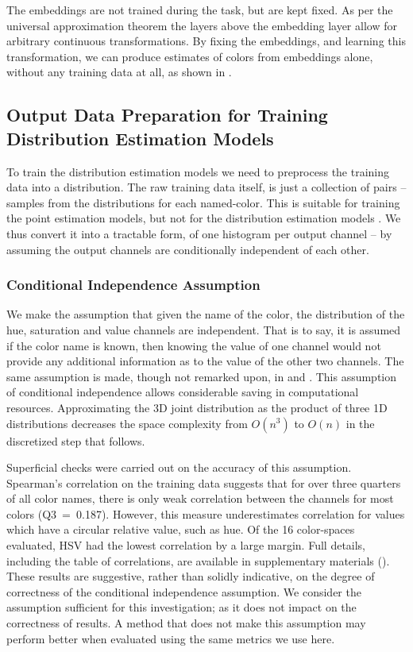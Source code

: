 The embeddings are not trained during the task, but are kept fixed.
As per the universal approximation theorem \parencite{leshno1993uat, SONODA2017uat} the layers above the embedding layer allow for arbitrary continuous transformations.
By fixing the embeddings, and learning this transformation,
we can produce estimates of colors from embeddings alone, without any training data at all, as shown in .

\subsection{Output Data Preparation for Training Distribution Estimation Models}\label{sec:output-data-preparation}
To train the distribution estimation models we need to preprocess the training data into a distribution.
The raw training data itself, is just a collection of 
 \datapairs{} pairs -- samples from the distributions for each named-color.
This is suitable for training the point estimation models, but not for the distribution estimation models .
We thus convert it into a tractable form, of one histogram per output channel -- by assuming the output channels are conditionally independent of each other.


\subsubsection{Conditional Independence Assumption} \label{sec:conditional-independence-assumption}
We make the assumption that given the name of the color, the distribution of the hue, saturation and value channels are independent.
That is to say, it is assumed if the color name is known, then  knowing the value of one channel would not provide any additional information as to the value of the other two channels.
The same assumption is made, though not remarked upon, in \textcite{meomcmahanstone:color} and \textcite{mcmahan2015bayesian}.
This assumption of conditional independence allows considerable saving in computational resources.
Approximating the 3D joint distribution as the product of three 1D distributions decreases the space complexity from $O(n^3)$ to $O(n)$ in the discretized step that follows.

Superficial checks were carried out on the accuracy of this assumption.
Spearman's correlation on the training data suggests that for over three quarters of all color names, there is only weak correlation between the channels for most colors (\mbox{Q3 = 0.187}).
However, this measure underestimates correlation for values which have a circular relative value, such as hue.
Of the 16 color-spaces evaluated, HSV had the lowest correlation by a large margin.
Full details, including the table of correlations, are available in supplementary materials ().
These results are suggestive, rather than solidly indicative, on the degree of correctness of the conditional independence assumption.
We consider the assumption sufficient for this investigation; as it does not impact on the correctness of results.
A method that does not make this assumption may perform better when evaluated using the same metrics we use here.

